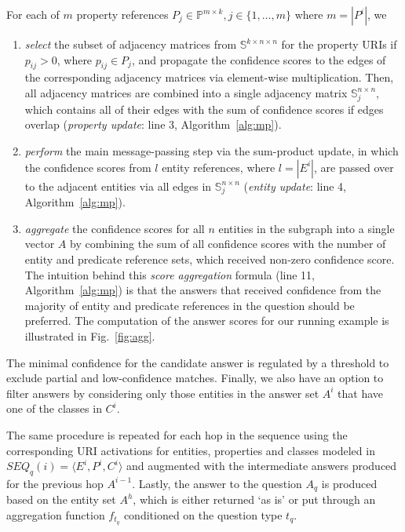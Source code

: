 For each of $m$ property references $P_j \in \mathbb{P}^{m\times k}, j \in \{1, \ldots, m\}$ where $m = |P^i|$, we
\begin{enumerate}[nosep,leftmargin=*]
\item \emph{select} the subset of adjacency matrices from $\mathbb{S}^{k\times n\times n}$ for the property URIs if $p_{ij} > 0$, where $p_{ij} \in P_j$, and propagate the confidence scores to the edges of the corresponding adjacency matrices via element-wise multiplication.
Then, all adjacency matrices are combined into a single adjacency matrix $\mathbb{S}_j^{n\times n}$, which contains all of their edges with the sum of confidence scores if edges overlap (\emph{property update}: line 3, Algorithm~\ref{alg:mp}).

\item \emph{perform} the main message-passing step via the sum-product update, in which the confidence scores from $l$ entity references, where $l = |E^i|$, are passed over to the adjacent entities via all edges in $\mathbb{S}_j^{n\times n}$ (\emph{entity update}: line 4, Algorithm~\ref{alg:mp}).

\item \emph{aggregate} the confidence scores for all $n$ entities in the subgraph into a single vector $A$ by combining the sum of all confidence scores with the number of entity and predicate reference sets, which received non-zero confidence score.
The intuition behind this \emph{score aggregation} formula (line 11,  Algorithm~\ref{alg:mp}) is that the answers that received confidence from the majority of entity and predicate references in the question should be preferred.
The computation of the answer scores for our running example is illustrated in Fig.~\ref{fig:agg}.
\end{enumerate}

\noindent%
The minimal confidence for the candidate answer is regulated by a threshold to exclude partial and low-confidence matches.
Finally, we also have an option to filter answers by considering only those entities in the answer set $A^i$ that have one of the classes in $C^i$.

The same procedure is repeated for each hop in the sequence using the corresponding URI activations for entities, properties and classes modeled in $SEQ_q(i)=\langle E^i, P^i, C^i\rangle$ and augmented with the intermediate answers produced for the previous hop $A^{i-1}$.
Lastly, the answer to the question $A_q$ is produced based on the entity set $A^h$, which is either returned `as is' or put through an aggregation function $f_{t_q}$ conditioned on the question type $t_q$.
